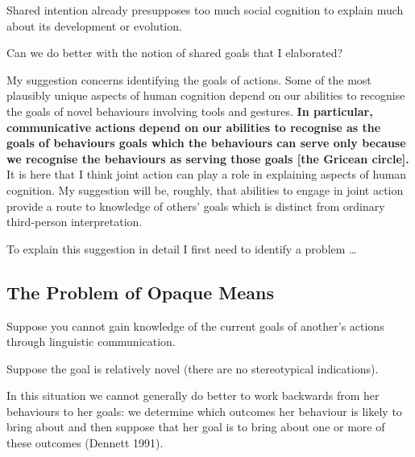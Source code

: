 \documentclass[14pt,a4paper]{extarticle}
\begin{document}
Shared intention already presupposes too much social cognition to explain much about its development or evolution.

Can we do better with the notion of shared goals that I elaborated?

My suggestion concerns identifying the goals of actions.  
Some of the most plausibly unique aspects of human cognition depend on our abilities to recognise the goals of novel behaviours involving tools and gestures.  
\textbf{In particular, communicative actions depend on our abilities to recognise as the goals of behaviours goals which the behaviours can serve only because we recognise the behaviours as serving those goals [the Gricean circle].}
It is here that I think joint action can play a role in explaining aspects of human cognition.  
My suggestion will be, roughly, that abilities to engage in joint action provide a route to knowledge of others’ goals which is distinct from ordinary third-person interpretation.  

To explain this suggestion in detail I first need to identify a problem …



\subsection{The Problem of Opaque Means}

Suppose you cannot gain knowledge of the current goals of another's actions through linguistic communication.

Suppose the goal is relatively novel (there are no stereotypical indications).

In this situation we cannot generally do better to work backwards from her behaviours to her goals: we determine which outcomes her behaviour is likely to bring about and then suppose that her goal is to bring about one or more of these outcomes (Dennett 1991).  
\end{document}
